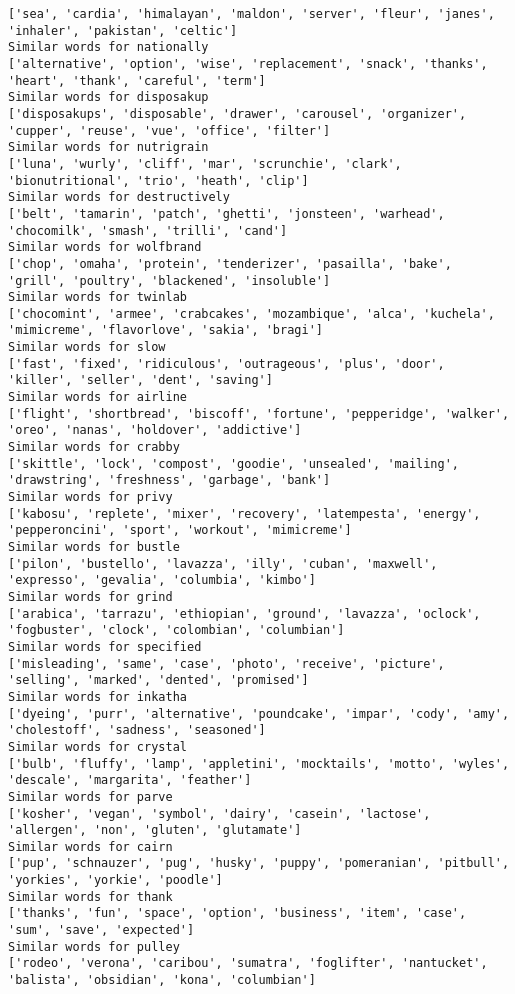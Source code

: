 \documentclass[11pt]{article}
\begin{document}
\begin{Verbatim}[commandchars=\\\{\}]
['sea', 'cardia', 'himalayan', 'maldon', 'server', 'fleur', 'janes', 'inhaler', 'pakistan', 'celtic']
Similar words for nationally
['alternative', 'option', 'wise', 'replacement', 'snack', 'thanks', 'heart', 'thank', 'careful', 'term']
Similar words for disposakup
['disposakups', 'disposable', 'drawer', 'carousel', 'organizer', 'cupper', 'reuse', 'vue', 'office', 'filter']
Similar words for nutrigrain
['luna', 'wurly', 'cliff', 'mar', 'scrunchie', 'clark', 'bionutritional', 'trio', 'heath', 'clip']
Similar words for destructively
['belt', 'tamarin', 'patch', 'ghetti', 'jonsteen', 'warhead', 'chocomilk', 'smash', 'trilli', 'cand']
Similar words for wolfbrand
['chop', 'omaha', 'protein', 'tenderizer', 'pasailla', 'bake', 'grill', 'poultry', 'blackened', 'insoluble']
Similar words for twinlab
['chocomint', 'armee', 'crabcakes', 'mozambique', 'alca', 'kuchela', 'mimicreme', 'flavorlove', 'sakia', 'bragi']
Similar words for slow
['fast', 'fixed', 'ridiculous', 'outrageous', 'plus', 'door', 'killer', 'seller', 'dent', 'saving']
Similar words for airline
['flight', 'shortbread', 'biscoff', 'fortune', 'pepperidge', 'walker', 'oreo', 'nanas', 'holdover', 'addictive']
Similar words for crabby
['skittle', 'lock', 'compost', 'goodie', 'unsealed', 'mailing', 'drawstring', 'freshness', 'garbage', 'bank']
Similar words for privy
['kabosu', 'replete', 'mixer', 'recovery', 'latempesta', 'energy', 'pepperoncini', 'sport', 'workout', 'mimicreme']
Similar words for bustle
['pilon', 'bustello', 'lavazza', 'illy', 'cuban', 'maxwell', 'expresso', 'gevalia', 'columbia', 'kimbo']
Similar words for grind
['arabica', 'tarrazu', 'ethiopian', 'ground', 'lavazza', 'oclock', 'fogbuster', 'clock', 'colombian', 'columbian']
Similar words for specified
['misleading', 'same', 'case', 'photo', 'receive', 'picture', 'selling', 'marked', 'dented', 'promised']
Similar words for inkatha
['dyeing', 'purr', 'alternative', 'poundcake', 'impar', 'cody', 'amy', 'cholestoff', 'sadness', 'seasoned']
Similar words for crystal
['bulb', 'fluffy', 'lamp', 'appletini', 'mocktails', 'motto', 'wyles', 'descale', 'margarita', 'feather']
Similar words for parve
['kosher', 'vegan', 'symbol', 'dairy', 'casein', 'lactose', 'allergen', 'non', 'gluten', 'glutamate']
Similar words for cairn
['pup', 'schnauzer', 'pug', 'husky', 'puppy', 'pomeranian', 'pitbull', 'yorkies', 'yorkie', 'poodle']
Similar words for thank
['thanks', 'fun', 'space', 'option', 'business', 'item', 'case', 'sum', 'save', 'expected']
Similar words for pulley
['rodeo', 'verona', 'caribou', 'sumatra', 'foglifter', 'nantucket', 'balista', 'obsidian', 'kona', 'columbian']

\end{Verbatim}
\end{document}
